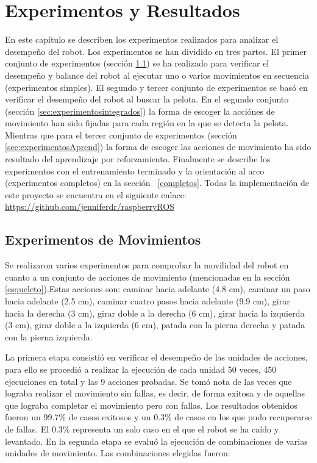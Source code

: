 \chapter{Experimentos y Resultados}\label{chapter:resultados}
En este capítulo se describen los experimentos realizados para analizar el desempeño del robot. Los experimentos se han dividido en tres partes. El primer conjunto de experimentos (sección \ref{sec:experimentosMov}) se ha realizado para verificar el desempeño y balance del robot al ejecutar uno o varios movimientos en secuencia (experimentos simples). El segundo y tercer conjunto de experimentos se bas\'o en verificar el desempeño del robot al buscar la pelota. En el segundo conjunto (sección \ref{sec:experimentosintegrados}) la forma de escoger la acciónes de movimiento han sido fijadas para cada región en la que se detecta la pelota. Mientras que para el tercer conjunto de experimentos (secci\'on \ref{sec:experimentosAprend}) la forma de escoger las acciones de movimiento ha sido resultado del aprendizaje por reforzamiento. Finalmente se describe los experimentos con el entrenamiento terminado y la orientaci\'on al arco (experimentos completos) en la secci\'on ~\ref{completos}. Todas la implementaci\'on de este proyecto se encuentra en el siguiente enlace:\url{ https://github.com/jenniferdr/raspberryROS}  
 
\section{Experimentos de Movimientos}\label{sec:experimentosMov}

Se realizaron varios experimentos para comprobar la movilidad del robot en cuanto a un conjunto de acciones de movimiento (mencionadas en la sección \ref{esqueleto}).Estas acciones son: caminar hacia adelante (4.8 cm), caminar un paso hacia adelante (2.5 cm), caminar cuatro pasos hacia adelante (9.9 cm), girar hacia la derecha (3 cm), girar doble a la derecha (6 cm), girar hacia la izquierda (3 cm), girar doble a la izquierda (6 cm), patada con la pierna derecha y patada con la pierna izquierda.

La primera etapa consistió en verificar el desempeño de las unidades de acciones, para ello se procedió a realizar la ejecución de cada unidad 50 veces, 450 ejecuciones en total y las 9 acciones probadas. Se tomó nota de las veces que lograba realizar el movimiento sin fallas, es decir, de forma exitosa y de aquellas que lograba completar el movimiento pero con fallas. Los resultados obtenidos fueron un 99.7\% de casos exitosos y un 0.3\% de casos en los que pudo recuperarse de fallas. El 0.3\% representa un solo caso en el que el robot se ha caído y levantado. En la segunda etapa se evalu\'o la ejecuci\'on de combinaciones de varias unidades de movimiento. Las combinaciones elegidas fueron: 

